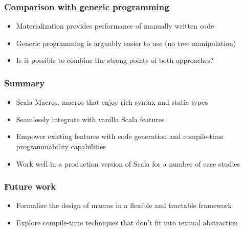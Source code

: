 \documentclass[svgnames,hyperref={bookmarks=false}]{beamer}
\begin{document}
\begin{frame}[fragile]
\frametitle{Comparison with generic programming}

\begin{itemize}
\item Materialization provides performance of manually written code
\item Generic programming is arguably easier to use (no tree manipulation)
\item Is it possible to combine the strong points of both approaches?
\end{itemize}
\end{frame}

\begin{frame}[fragile]
\frametitle{}

\vskip40pt
\begin{center}
\end{center}
\end{frame}

\begin{frame}[fragile]
\frametitle{Summary}

\begin{itemize}
\item Scala Macros, macros that enjoy rich syntax and static types
\item Seamlessly integrate with vanilla Scala features
\item Empower existing features with code generation and compile-time programmability capabilities
\item Work well in a production version of Scala for a number of case studies
\end{itemize}
\end{frame}

\begin{frame}[fragile]
\frametitle{Future work}

\begin{itemize}
\item Formalize the design of macros in a flexible and tractable framework
\item Explore compile-time techniques that don't fit into textual abstraction
\end{itemize}
\end{frame}
\end{document}
